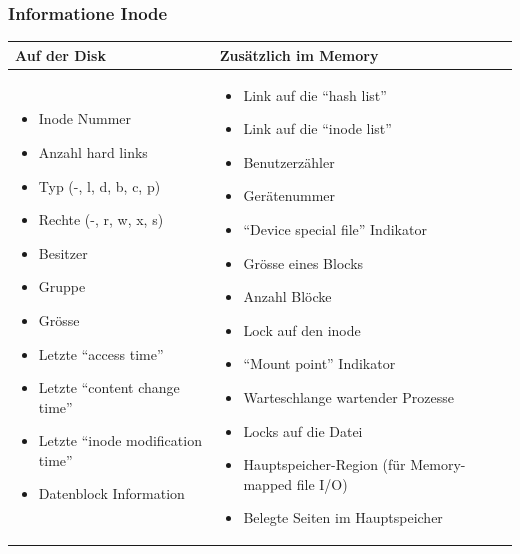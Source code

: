 \documentclass[a4paper, 10pt]{article}
\begin{document}
\subsubsection{Informatione Inode}
\begin{tabular}{p{7cm}|p{7cm}}
\textbf{Auf der Disk} & \textbf{Zusätzlich im Memory} \\ \hline
\begin{itemize}
\item Inode Nummer
\item Anzahl hard links
\item Typ (-, l, d, b, c, p)
\item Rechte (-, r, w, x, s)
\item Besitzer
\item Gruppe
\item Grösse
\item Letzte “access time”
\item Letzte “content change time”
\item Letzte “inode modification time”
\item Datenblock Information
\end{itemize}
&
\begin{itemize}
\item Link auf die “hash list”
\item Link auf die “inode list”
\item Benutzerzähler
\item Gerätenummer
\item “Device special file” Indikator
\item Grösse eines Blocks
\item Anzahl Blöcke
\item Lock auf den inode
\item “Mount point” Indikator
\item Warteschlange wartender Prozesse
\item Locks auf die Datei
\item Hauptspeicher-Region (für Memory-mapped file I/O)
\item Belegte Seiten im Hauptspeicher
\end{itemize}
\end{tabular}
\end{document}
